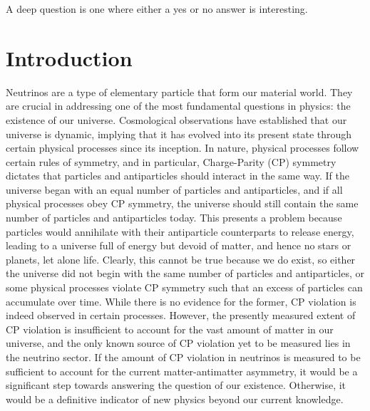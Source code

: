 \begin{savequote}[8cm]
\textlatin{A deep question is one where either a yes or no answer is interesting.}

\end{savequote}

\chapter{\label{ch:intro}Introduction} 

\minitoc

Neutrinos are a type of elementary particle that form our material world. 
They are crucial in addressing one of the most fundamental questions in physics: the existence of our universe. 
Cosmological observations have established that our universe is dynamic, implying that it has evolved into its present state through certain physical processes since its inception.
In nature, physical processes follow certain rules of symmetry, and in particular, Charge-Parity (CP) symmetry dictates that particles and antiparticles should interact in the same way. 
If the universe began with an equal number of particles and antiparticles, and if all physical processes obey CP symmetry, the universe should still contain the same number of particles and antiparticles today.
This presents a problem because particles would annihilate with their antiparticle counterparts to release energy, leading to a universe full of energy but devoid of matter, and hence no stars or planets, let alone life.
Clearly, this cannot be true because we do exist, so either the universe did not begin with the same number of particles and antiparticles, or some physical processes violate CP symmetry such that an excess of particles can accumulate over time. 
While there is no evidence for the former, CP violation is indeed observed in certain processes. 
However, the presently measured extent of CP violation is insufficient to account for the vast amount of matter in our universe, and the only known source of CP violation yet to be measured lies in the neutrino sector. 
If the amount of CP violation in neutrinos is measured to be sufficient to account for the current matter-antimatter asymmetry, it would be a significant step towards answering the question of our existence. 
Otherwise, it would be a definitive indicator of new physics beyond our current knowledge.

